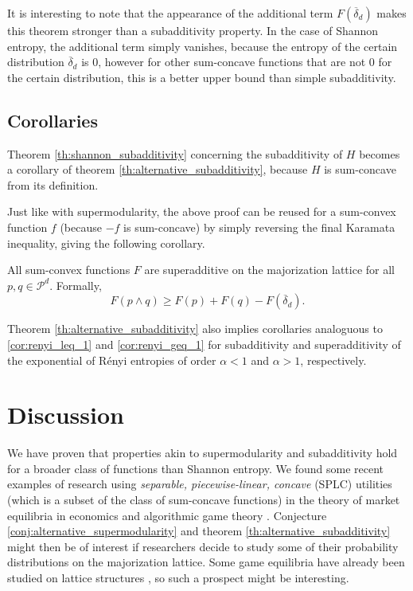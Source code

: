 It is interesting to note that the appearance of the additional term $F(\overline{\delta}_d)$ makes this theorem stronger than a subadditivity property. In the case of Shannon entropy, the additional term simply vanishes, because the entropy of the certain distribution $\overline{\delta}_d$ is 0, however for other sum-concave functions that are not 0 for the certain distribution, this is a better upper bound than simple subadditivity.



\subsection{Corollaries}

Theorem \ref{th:shannon_subadditivity} concerning the subadditivity of $H$ becomes a corollary of theorem \ref{th:alternative_subadditivity}, because $H$ is sum-concave from its definition.

Just like with supermodularity, the above proof can be reused for a sum-convex function $f$ (because $-f$ is sum-concave) by simply reversing the final Karamata inequality, giving the following corollary.

\begin{corollary} \label{cor:superadditivity_sum-convex}
    All sum-convex functions $F$ are superadditive on the majorization lattice for all $p, q \in \mathcal{P}^d$. Formally,
    \begin{equation} \label{eq:superadditivity}
        F(p \wedge q) \geq F(p) + F(q) - F(\overline{\delta}_d).
    \end{equation}
\end{corollary}

Theorem \ref{th:alternative_subadditivity} also implies corollaries analoguous to \ref{cor:renyi_leq_1} and \ref{cor:renyi_geq_1} for subadditivity and superadditivity of the exponential of Rényi entropies of order $\alpha < 1$ and $\alpha > 1$, respectively.



\section{Discussion}

We have proven that properties akin to supermodularity and subadditivity hold for a broader class of functions than Shannon entropy. We found some recent examples of research using \textit{separable, piecewise-linear, concave} (SPLC) utilities (which is a subset of the class of sum-concave functions) in the theory of market equilibria in economics and algorithmic game theory \cite{vazirani_market_2011, anari_nash_2017}. Conjecture \ref{conj:alternative_supermodularity} and theorem \ref{th:alternative_subadditivity} might then be of interest if researchers decide to study some of their probability distributions on the majorization lattice. Some game equilibria have already been studied on lattice structures \cite{agliardi_generalization_2000}, so such a prospect might be interesting.

